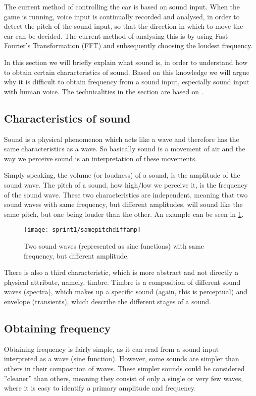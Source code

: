 The current method of controlling the car is based on sound input.
When the game is running, voice input is continually recorded and analysed, in order to detect the pitch of the sound input, so that the direction in which to move the car can be decided.
The current method of analysing this is by using Fast Fourier's Transformation (FFT) and subsequently choosing the loudest frequency.

In this section we will briefly explain what sound is, in order to understand how to obtain certain characteristics of sound.
Based on this knowledge we will argue why it is difficult to obtain frequency from a sound input, especially sound input with human voice.
The technicalities in the section are based on \cite{music-and-computers}.

\subsection{Characteristics of sound}
Sound is a physical phenomenon which acts like a wave and therefore has the same characteristics as a wave.
So basically sound is a movement of air and the way we perceive sound is an interpretation of these movements.

Simply speaking, the volume (or loudness) of a sound, is the amplitude of the sound wave.
The pitch of a sound, how high/low we perceive it, is the frequency of the sound wave.
These two characteristics are independent, meaning that two sound waves with same frequency, but different amplitudes, will sound like the same pitch, but one being louder than the other.
An example can be seen in \cref{fig:samepitchdiffamp}.

\begin{figure}[h]
\centering
\texttt{[image: sprint1/samepitchdiffamp]}
\caption{Two sound waves (represented as sine functions) with same frequency, but different amplitude.}
\label{fig:samepitchdiffamp}
\end{figure}

There is also a third characteristic, which is more abstract and not directly a physical attribute, namely, timbre.
Timbre is a composition of different sound waves (spectra), which makes up a specific sound (again, this is perceptual) and envelope (transients), which describe the different stages of a sound.

\subsection{Obtaining frequency}
Obtaining frequency is fairly simple, as it can read from a sound input interpreted as a wave (sine function).
However, some sounds are simpler than others in their composition of waves.
These simpler sounds could be considered ''cleaner'' than others, meaning they consist of only a single or very few waves, where it is easy to identify a primary amplitude and frequency.

